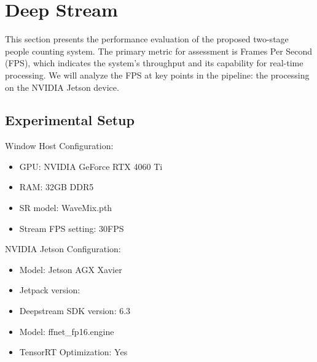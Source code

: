 \section{Deep Stream}
This section presents the performance evaluation of the proposed two-stage people counting system. The primary metric for assessment is Frames Per Second (FPS), which indicates the system's throughput and its capability for real-time processing. We will analyze the FPS at key points in the pipeline: the processing on the NVIDIA Jetson device.
\subsection{Experimental Setup}
{Window Host Configuration}:
\begin{itemize}
    \item GPU: NVIDIA GeForce RTX 4060 Ti
    \item RAM: 32GB DDR5
    \item SR model: WaveMix.pth
    \item Stream FPS setting: 30FPS
\end{itemize}
{NVIDIA Jetson Configuration}:
\begin{itemize}
    \item Model: Jetson AGX Xavier
    \item Jetpack version:
    \item Deepstream SDK version: 6.3
    \item Model:  ffnet\_fp16.engine
    \item TensorRT Optimization:  Yes
\end{itemize}

